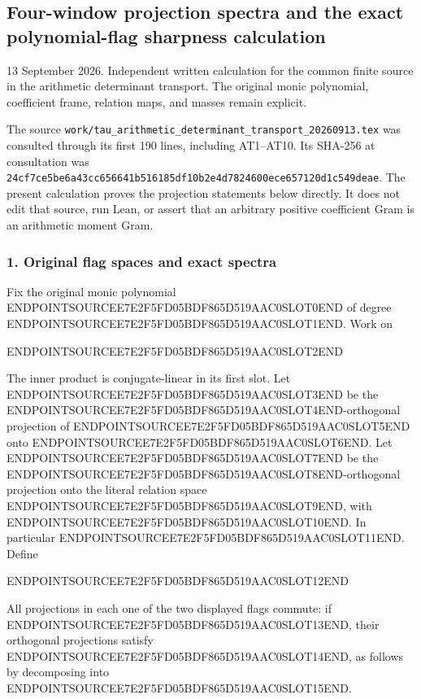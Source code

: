 \subsection{Four-window projection spectra and the exact polynomial-flag sharpness calculation}\label{endpoint-four_window_sharpness--four-window-projection-spectra-and-the-exact-polynomial-flag-sharpness-calculation}

13 September 2026. Independent written calculation for the common finite source in the arithmetic determinant transport. The original monic polynomial, coefficient frame, relation maps, and masses remain explicit.

The source \texttt{work/tau\_arithmetic\_determinant\_transport\_20260913.tex} was consulted through its first 190 lines, including AT1--AT10. Its SHA-256 at consultation was \texttt{24cf7ce5be6a43cc656641b516185df10b2e4d7824600ece657120d1c549deae}. The present calculation proves the projection statements below directly. It does not edit that source, run Lean, or assert that an arbitrary positive coefficient Gram is an arithmetic moment Gram.

\subsubsection{1. Original flag spaces and exact spectra}\label{endpoint-four_window_sharpness--original-flag-spaces-and-exact-spectra}

Fix the original monic polynomial ENDPOINTSOURCEE7E2F5FD05BDF865D519AAC0SLOT0END of degree ENDPOINTSOURCEE7E2F5FD05BDF865D519AAC0SLOT1END. Work on

ENDPOINTSOURCEE7E2F5FD05BDF865D519AAC0SLOT2END

The inner product is conjugate-linear in its first slot. Let ENDPOINTSOURCEE7E2F5FD05BDF865D519AAC0SLOT3END be the ENDPOINTSOURCEE7E2F5FD05BDF865D519AAC0SLOT4END-orthogonal projection of ENDPOINTSOURCEE7E2F5FD05BDF865D519AAC0SLOT5END onto ENDPOINTSOURCEE7E2F5FD05BDF865D519AAC0SLOT6END. Let ENDPOINTSOURCEE7E2F5FD05BDF865D519AAC0SLOT7END be the ENDPOINTSOURCEE7E2F5FD05BDF865D519AAC0SLOT8END-orthogonal projection onto the literal relation space ENDPOINTSOURCEE7E2F5FD05BDF865D519AAC0SLOT9END, with ENDPOINTSOURCEE7E2F5FD05BDF865D519AAC0SLOT10END. In particular ENDPOINTSOURCEE7E2F5FD05BDF865D519AAC0SLOT11END. Define

ENDPOINTSOURCEE7E2F5FD05BDF865D519AAC0SLOT12END

All projections in each one of the two displayed flags commute: if ENDPOINTSOURCEE7E2F5FD05BDF865D519AAC0SLOT13END, their orthogonal projections satisfy ENDPOINTSOURCEE7E2F5FD05BDF865D519AAC0SLOT14END, as follows by decomposing into ENDPOINTSOURCEE7E2F5FD05BDF865D519AAC0SLOT15END.

